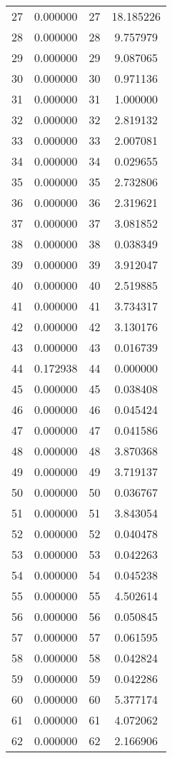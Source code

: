 \documentclass[12pt]{article}
\begin{document}
\begin{longtable}{@{}cccc@{}}
27 & 0.000000 & 27 & 18.185226 \\
28 & 0.000000 & 28 & 9.757979 \\
29 & 0.000000 & 29 & 9.087065 \\
30 & 0.000000 & 30 & 0.971136 \\
31 & 0.000000 & 31 & 1.000000 \\
32 & 0.000000 & 32 & 2.819132 \\
33 & 0.000000 & 33 & 2.007081 \\
34 & 0.000000 & 34 & 0.029655 \\
35 & 0.000000 & 35 & 2.732806 \\
36 & 0.000000 & 36 & 2.319621 \\
37 & 0.000000 & 37 & 3.081852 \\
38 & 0.000000 & 38 & 0.038349 \\
39 & 0.000000 & 39 & 3.912047 \\
40 & 0.000000 & 40 & 2.519885 \\
41 & 0.000000 & 41 & 3.734317 \\
42 & 0.000000 & 42 & 3.130176 \\
43 & 0.000000 & 43 & 0.016739 \\
44 & 0.172938 & 44 & 0.000000 \\
45 & 0.000000 & 45 & 0.038408 \\
46 & 0.000000 & 46 & 0.045424 \\
47 & 0.000000 & 47 & 0.041586 \\
48 & 0.000000 & 48 & 3.870368 \\
49 & 0.000000 & 49 & 3.719137 \\
50 & 0.000000 & 50 & 0.036767 \\
51 & 0.000000 & 51 & 3.843054 \\
52 & 0.000000 & 52 & 0.040478 \\
53 & 0.000000 & 53 & 0.042263 \\
54 & 0.000000 & 54 & 0.045238 \\
55 & 0.000000 & 55 & 4.502614 \\
56 & 0.000000 & 56 & 0.050845 \\
57 & 0.000000 & 57 & 0.061595 \\
58 & 0.000000 & 58 & 0.042824 \\
59 & 0.000000 & 59 & 0.042286 \\
60 & 0.000000 & 60 & 5.377174 \\
61 & 0.000000 & 61 & 4.072062 \\
62 & 0.000000 & 62 & 2.166906 \\

\end{longtable}
\end{document}
